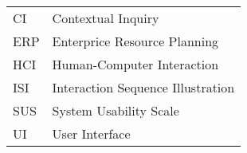 \documentclass[12pt,a4paper,oneside,pdftex]{report}
\begin{document}
\noindent
\begin{longtable}{@{}p{}p{}@{}}
CI & Contextual Inquiry \\
ERP & Enterprice Resource Planning \\
HCI & Human-Computer Interaction \\
ISI & Interaction Sequence Illustration \\
SUS & System Usability Scale \\
UI & User Interface \\



\end{longtable}


\cleardoublepage
\tableofcontents



\label{pages-prelude}
\cleardoublepage

\startfirstchapter
\end{document}
